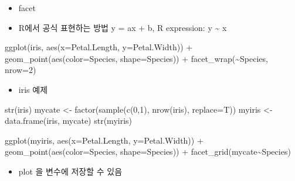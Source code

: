 \documentclass[
]{book}
\newenvironment{Shaded}{\begin{snugshade}}{\end{snugshade}}
\newcommand{\AttributeTok}[1]{\textcolor[rgb]{0.77,0.63,0.00}{#1}}
\newcommand{\DecValTok}[1]{\textcolor[rgb]{0.00,0.00,0.81}{#1}}
\newcommand{\FunctionTok}[1]{\textcolor[rgb]{0.00,0.00,0.00}{#1}}
\newcommand{\NormalTok}[1]{#1}
\newcommand{\OtherTok}[1]{\textcolor[rgb]{0.56,0.35,0.01}{#1}}
\newcommand{\SpecialCharTok}[1]{\textcolor[rgb]{0.00,0.00,0.00}{#1}}
\providecommand{\tightlist}{%
  \setlength{\itemsep}{0pt}\setlength{\parskip}{0pt}}
\begin{document}
\begin{itemize}
\tightlist
\item
  facet
\item
  R에서 공식 표현하는 방법 y = ax + b, R expression: y \textasciitilde{} x
\end{itemize}

\begin{Shaded}
\begin{Highlighting}[]
\FunctionTok{ggplot}\NormalTok{(iris, }\FunctionTok{aes}\NormalTok{(}\AttributeTok{x=}\NormalTok{Petal.Length, }\AttributeTok{y=}\NormalTok{Petal.Width)) }\SpecialCharTok{+} 
  \FunctionTok{geom\_point}\NormalTok{(}\FunctionTok{aes}\NormalTok{(}\AttributeTok{color=}\NormalTok{Species, }\AttributeTok{shape=}\NormalTok{Species)) }\SpecialCharTok{+}
  \FunctionTok{facet\_wrap}\NormalTok{(}\SpecialCharTok{\textasciitilde{}}\NormalTok{Species, }\AttributeTok{nrow=}\DecValTok{2}\NormalTok{)}
\end{Highlighting}
\end{Shaded}

\begin{itemize}
\tightlist
\item
  iris 예제
\end{itemize}

\begin{Shaded}
\begin{Highlighting}[]
\FunctionTok{str}\NormalTok{(iris)}
\NormalTok{mycate }\OtherTok{\textless{}{-}} \FunctionTok{factor}\NormalTok{(}\FunctionTok{sample}\NormalTok{(}\FunctionTok{c}\NormalTok{(}\DecValTok{0}\NormalTok{,}\DecValTok{1}\NormalTok{), }\FunctionTok{nrow}\NormalTok{(iris), }\AttributeTok{replace=}\NormalTok{T))}
\NormalTok{myiris }\OtherTok{\textless{}{-}} \FunctionTok{data.frame}\NormalTok{(iris, mycate)}
\FunctionTok{str}\NormalTok{(myiris)}


\FunctionTok{ggplot}\NormalTok{(myiris, }\FunctionTok{aes}\NormalTok{(}\AttributeTok{x=}\NormalTok{Petal.Length, }\AttributeTok{y=}\NormalTok{Petal.Width)) }\SpecialCharTok{+} 
  \FunctionTok{geom\_point}\NormalTok{(}\FunctionTok{aes}\NormalTok{(}\AttributeTok{color=}\NormalTok{Species, }\AttributeTok{shape=}\NormalTok{Species)) }\SpecialCharTok{+}
  \FunctionTok{facet\_grid}\NormalTok{(mycate}\SpecialCharTok{\textasciitilde{}}\NormalTok{Species)}
\end{Highlighting}
\end{Shaded}

\begin{itemize}
\tightlist
\item
  plot 을 변수에 저장할 수 있음
\end{itemize}
\end{document}
